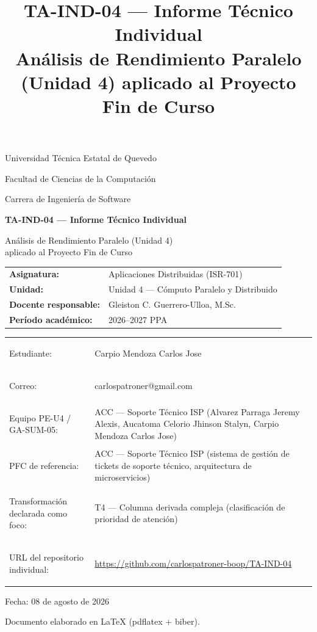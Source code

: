 \documentclass[11pt,a4paper]{article}
\title{\textbf{TA-IND-04 --- Informe Técnico Individual}\\[0.3em]
\large Análisis de Rendimiento Paralelo (Unidad 4) aplicado al Proyecto Fin de Curso}
\author{}
\date{}
\begin{document}
\begin{titlepage}
\centering
\vspace*{1cm}
{\large Universidad Técnica Estatal de Quevedo\par}
{\large Facultad de Ciencias de la Computación\par}
{\large Carrera de Ingeniería de Software\par}
\vspace{1.2cm}

{\Large\bfseries TA-IND-04 --- Informe Técnico Individual\par}
\vspace{0.4cm}
{\large Análisis de Rendimiento Paralelo (Unidad 4)\\ aplicado al Proyecto Fin de Curso\par}
\vspace{1.2cm}

\begin{tabular}{ll}
\textbf{Asignatura:} & Aplicaciones Distribuidas (ISR-701) \\
\textbf{Unidad:} & Unidad 4 --- Cómputo Paralelo y Distribuido \\
\textbf{Docente responsable:} & Gleiston C. Guerrero-Ulloa, M.Sc. \\
\textbf{Período académico:} & 2026--2027 PPA \\
\end{tabular}

\vspace{1.2cm}
\begin{tabular}{>{\bfseries\raggedright}p{4.6cm} p{9.6cm}}
Estudiante: & Carpio Mendoza Carlos Jose \\[3pt]
Correo: & carlospatroner@gmail.com \\[3pt]
Equipo PE-U4 / GA-SUM-05: & ACC --- Soporte Técnico ISP (Alvarez Parraga Jeremy Alexis,
 Aucatoma Celorio Jhinson Stalyn, Carpio Mendoza Carlos Jose) \\[3pt]
PFC de referencia: & ACC --- Soporte Técnico ISP (sistema de gestión de tickets de soporte
 técnico, arquitectura de microservicios) \\[3pt]
Transformación declarada como foco: & T4 --- Columna derivada compleja (clasificación de
 prioridad de atención) \\[3pt]
URL del repositorio individual: & \url{https://github.com/carlospatroner-boop/TA-IND-04} \\
\end{tabular}

\vspace{1.5cm}
{\large Fecha: 08 de agosto de 2026\par}

\vfill
{\small Documento elaborado en \LaTeX{} (pdflatex + biber).\par}
\end{titlepage}
\end{document}
